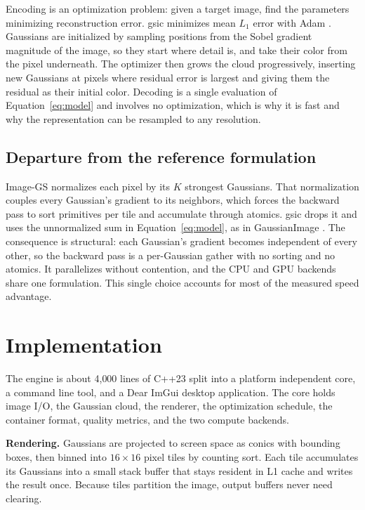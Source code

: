 \documentclass[11pt,a4paper]{article}
\begin{document}
Encoding is an optimization problem: given a target image, find the parameters minimizing reconstruction error. gsic minimizes mean $L_1$ error with Adam \cite{adam}. Gaussians are initialized by sampling positions from the Sobel gradient magnitude of the image, so they start where detail is, and take their color from the pixel underneath. The optimizer then grows the cloud progressively, inserting new Gaussians at pixels where residual error is largest and giving them the residual as their initial color. Decoding is a single evaluation of Equation~\ref{eq:model} and involves no optimization, which is why it is fast and why the representation can be resampled to any resolution.

\subsection{Departure from the reference formulation}

Image-GS normalizes each pixel by its $K$ strongest Gaussians. That normalization couples every Gaussian's gradient to its neighbors, which forces the backward pass to sort primitives per tile and accumulate through atomics. gsic drops it and uses the unnormalized sum in Equation~\ref{eq:model}, as in GaussianImage \cite{gaussianimage}. The consequence is structural: each Gaussian's gradient becomes independent of every other, so the backward pass is a per-Gaussian gather with no sorting and no atomics. It parallelizes without contention, and the CPU and GPU backends share one formulation. This single choice accounts for most of the measured speed advantage.

\newpage

\section{Implementation}

The engine is about 4{,}000 lines of C++23 split into a platform independent core, a command line tool, and a Dear ImGui desktop application. The core holds image I/O, the Gaussian cloud, the renderer, the optimization schedule, the container format, quality metrics, and the two compute backends.

\textbf{Rendering.} Gaussians are projected to screen space as conics with bounding boxes, then binned into $16\times16$ pixel tiles by counting sort. Each tile accumulates its Gaussians into a small stack buffer that stays resident in L1 cache and writes the result once. Because tiles partition the image, output buffers never need clearing.
\end{document}
